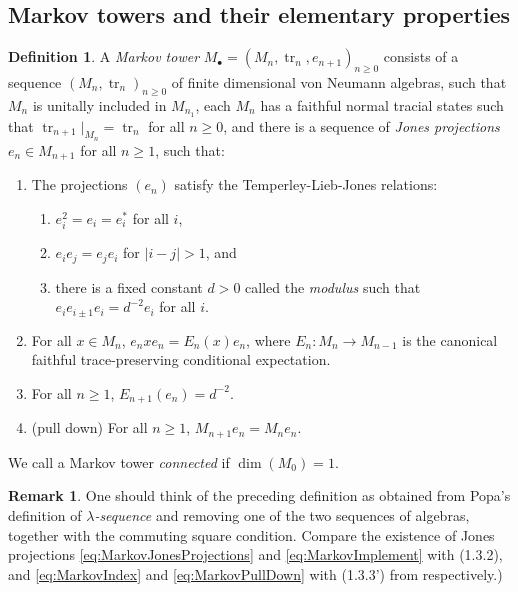 \documentclass[11pt]{article}
\theoremstyle{plain}
\theoremstyle{definition}
\newtheorem{defn}[thm]{Definition}
\newtheorem{rem}[thm]{Remark}
\DeclareMathOperator{\tr}{tr}
\begin{document}
\subsection{Markov towers and their elementary properties}
\label{sec:MarkovTowersAndElementaryProperties}
\begin{defn}
A \emph{Markov tower} $M_\bullet = (M_n, \tr_n, e_{n+1})_{n\geq 0}$ consists of a sequence $(M_n, \tr_n)_{n\geq 0}$ of finite dimensional von Neumann algebras, such that $M_n$ is unitally included in $M_{n_1}$, each $M_n$ has a faithful normal tracial states such that $\tr_{n+1}|_{M_n} = \tr_n$ for all $n\geq 0$, and there is a sequence of \emph{Jones projections} $e_n \in M_{n+1}$ for all $n\geq 1$, such that:
\begin{enumerate}[label={\rm(M\arabic*)}]
\item
\label{eq:MarkovJonesProjections}
The projections $(e_n)$ satisfy the Temperley-Lieb-Jones relations:
\begin{enumerate}[label={\rm(\alph*)}]
\item
$e_i^2 = e_i = e_i^*$ for all $i$,
\item
$e_i e_j = e_j e_i$ for $|i-j|>1$, and
\item
there is a fixed constant $d>0$ called the \emph{modulus} such that $e_{i} e_{i\pm 1} e_i = d^{-2} e_i$ for all $i$.
\end{enumerate}
\item
\label{eq:MarkovImplement}
For all $x\in M_n$, $e_n x e_n = E_n(x)e_n$, where $E_n: M_n \to M_{n-1}$ is the canonical faithful trace-preserving conditional expectation.
\item
\label{eq:MarkovIndex}
For all $n\geq 1$, $E_{n+1}(e_n) = d^{-2}$.
\item
\label{eq:MarkovPullDown}
(pull down)
For all $n\geq 1$, $M_{n+1}e_n = M_n e_n$.
\end{enumerate}
We call a Markov tower \emph{connected} if $\dim(M_0) = 1$.
\end{defn}

\begin{rem}
One should think of the preceding definition as obtained from Popa's definition of \emph{$\lambda$-sequence} \cite{MR1334479} and removing one of the two sequences of algebras, together with the commuting square condition.
Compare the existence of Jones projections \ref{eq:MarkovJonesProjections} and \ref{eq:MarkovImplement} with (1.3.2), and \ref{eq:MarkovIndex} and \ref{eq:MarkovPullDown} with (1.3.3') from \cite{MR1334479} respectively.)
\end{rem}
\end{document}

